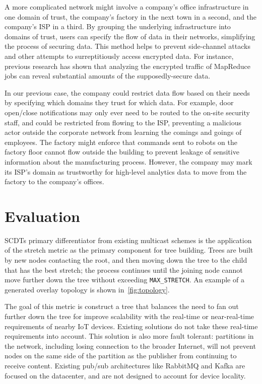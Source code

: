 A more complicated network might involve a company's office infrastructure in one domain of trust, the company's factory in the next town in a second, and the company's ISP in a third. By grouping the underlying infrastructure into domains of trust, users can specify the flow of data in their networks, simplifying the process of securing data. This method helps to prevent side-channel attacks and other attempts to surreptitiously access encrypted data. For instance, previous research \cite{sidechannel} has shown that analyzing the encrypted traffic of MapReduce jobs can reveal substantial amounts of the supposedly-secure data.

In our previous case, the company could restrict data flow based on their needs by specifying which domains they trust for which data. For example, door open/close notifications may only ever need to be routed to the on-site security staff, and could be restricted from flowing to the ISP, preventing a malicious actor outside the corporate network from learning the comings and goings of employees. The factory might enforce that commands sent to robots on the factory floor cannot flow outside the building to prevent leakage of sensitive information about the manufacturing process. However, the company may mark its ISP's domain as trustworthy for high-level analytics data to move from the factory to the company's offices. 

\section{Evaluation}
\label{scdt-eval}
SCDTs primary differentiator from existing multicast schemes is the application of the stretch metric as the primary component for tree building. Trees are built by new nodes contacting the root, and then moving down the tree to the child that has the best stretch; the process continues until the joining node cannot move further down the tree without exceeding \texttt{MAX\_STRETCH}. An example of a generated overlay topology is shown in~\autoref{fig:topology}.

The goal of this metric is construct a tree that balances the need to fan out further down the tree for improve scalability with the real-time or near-real-time requirements of nearby IoT devices. Existing solutions do not take these real-time requirements into account. This solution is also more fault tolerant: partitions in the network, including losing connection to the broader Internet, will not prevent nodes on the same side of the partition as the publisher from continuing to receive content. Existing pub/sub architectures like RabbitMQ and Kafka are focused on the datacenter, and are not designed to account for device locality.


